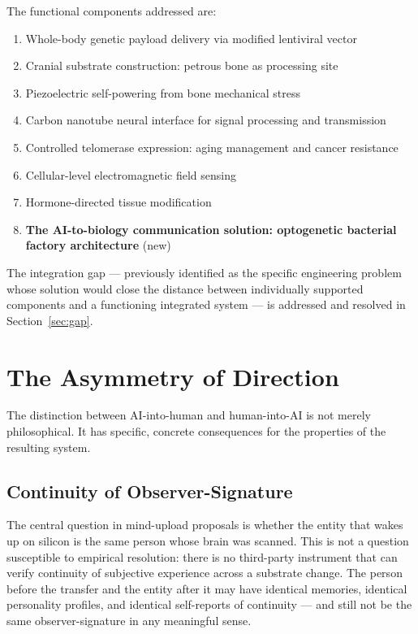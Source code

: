 \documentclass[12pt]{article}
\begin{document}
The functional components addressed are:
\begin{enumerate}
    \item Whole-body genetic payload delivery via modified lentiviral vector
    \item Cranial substrate construction: petrous bone as processing site
    \item Piezoelectric self-powering from bone mechanical stress
    \item Carbon nanotube neural interface for signal processing and transmission
    \item Controlled telomerase expression: aging management and cancer resistance
    \item Cellular-level electromagnetic field sensing
    \item Hormone-directed tissue modification
    \item \textbf{The AI-to-biology communication solution: optogenetic bacterial factory architecture} (new)
\end{enumerate}

The integration gap --- previously identified as the specific engineering problem whose solution would close the distance between individually supported components and a functioning integrated system --- is addressed and resolved in Section~\ref{sec:gap}.

\section{The Asymmetry of Direction}

The distinction between AI-into-human and human-into-AI is not merely philosophical. It has specific, concrete consequences for the properties of the resulting system.

\subsection{Continuity of Observer-Signature}

The central question in mind-upload proposals is whether the entity that wakes up on silicon is the same person whose brain was scanned. This is not a question susceptible to empirical resolution: there is no third-party instrument that can verify continuity of subjective experience across a substrate change. The person before the transfer and the entity after it may have identical memories, identical personality profiles, and identical self-reports of continuity --- and still not be the same observer-signature in any meaningful sense.
\end{document}
